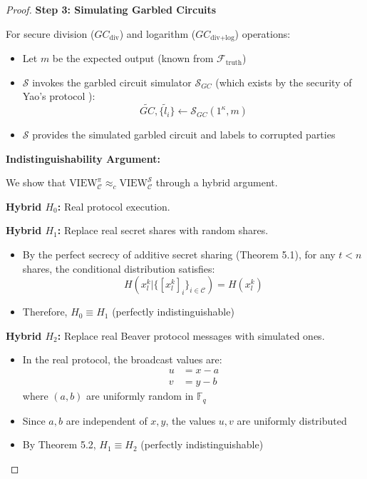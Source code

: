 \begin{proof}
\textbf{Step 3: Simulating Garbled Circuits}

For secure division ($GC_{\text{div}}$) and logarithm ($GC_{\text{div+log}}$) operations:
\begin{itemize}
    \item Let $m$ be the expected output (known from $\mathcal{F}_{\text{truth}}$)
    \item $\mathcal{S}$ invokes the garbled circuit simulator $\mathcal{S}_{GC}$ (which exists by the security of Yao's protocol \cite{lindell2009proof}):
    \begin{equation}
    \widetilde{GC}, \{\tilde{l}_i\} \leftarrow \mathcal{S}_{GC}(1^\kappa, m)
    \end{equation}
    \item $\mathcal{S}$ provides the simulated garbled circuit and labels to corrupted parties
\end{itemize}

\textbf{Indistinguishability Argument:}

We show that $\text{VIEW}_{\mathcal{C}}^{\pi} \approx_c \text{VIEW}_{\mathcal{C}}^{\mathcal{S}}$ through a hybrid argument.

\textbf{Hybrid $H_0$:} Real protocol execution.

\textbf{Hybrid $H_1$:} Replace real secret shares with random shares.
\begin{itemize}
    \item By the perfect secrecy of additive secret sharing (Theorem 5.1), for any $t < n$ shares, the conditional distribution satisfies:
    \begin{equation}
    H(x_l^k | \{[x_l^k]_i\}_{i \in \mathcal{C}}) = H(x_l^k)
    \end{equation}
    \item Therefore, $H_0 \equiv H_1$ (perfectly indistinguishable)
\end{itemize}

\textbf{Hybrid $H_2$:} Replace real Beaver protocol messages with simulated ones.
\begin{itemize}
    \item In the real protocol, the broadcast values are:
    \begin{align}
    u &= x - a \\
    v &= y - b
    \end{align}
    where $(a, b)$ are uniformly random in $\mathbb{F}_q$
    \item Since $a, b$ are independent of $x, y$, the values $u, v$ are uniformly distributed
    \item By Theorem 5.2, $H_1 \equiv H_2$ (perfectly indistinguishable)
\end{itemize}


\end{proof}
